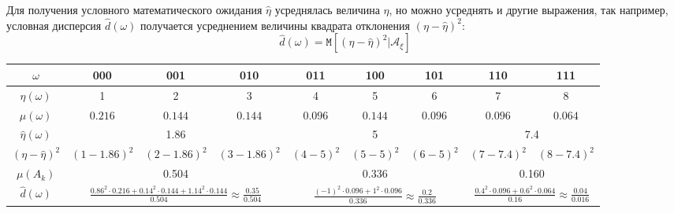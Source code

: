 \documentclass[a4paper,12pt]{article}
\newcommand{\cexpectation}[2]{\texttt{M} \left[ #1 | #2 \right]}
\begin{document}
Для получения условного математического ожидания $\widehat{\eta}$ усреднялась величина $\eta$, но можно усреднять и другие
выражения, так например, условная дисперсия $\widehat{d}(\omega)$ получается усреднением величины квадрата отклонения $(\eta - \widehat{\eta})^2$:
\[
    \widehat{d}(\omega) = \cexpectation{(\eta - \widehat{\eta})^2}{\mathcal{A}_\xi}
\]

\begin{center}
    \begin{tabular}{|c|c|c|c|c|c|c|c|c|}
        \hline
        $\omega$                                & 000                         & 001                         & 010                         & 011     & 100     & 101     & 110     & 111     \\
        \hline
        $\eta(\omega)$                          & 1                           & 2                           & 3                           & 4       & 5       & 6       & 7       & 8       \\
        \hline
        $\mu(\omega)$                           & $0.216$                     & $0.144$                     & $0.144$                     & $0.096$ & $0.144$ & $0.096$ & $0.096$ & $0.064$ \\
        \hline
        $\widehat{\eta}(\omega)$                & \multicolumn{3}{|c|}{1.86}  & \multicolumn{3}{|c|}{5}     & \multicolumn{2}{|c|}{7.4}                                                     \\
        \hline
        $(\eta - \widehat{\eta})^2$             & $(1-1.86)^2$                    & $(2-1.86)^2$                    & $(3-1.86)^2$                    & $(4-5)^2$     & $(5-5)^2$     & $(6-5)^2$     & $(7-7.4)^2$   & $(8-7.4)^2$     \\
        \hline
        $\mu(A_k)$                              & \multicolumn{3}{|c|}{0.504} & \multicolumn{3}{|c|}{0.336} & \multicolumn{2}{|c|}{0.160}                                                   \\
        \hline
        $\widehat{d}(\omega)$                   & \multicolumn{3}{|c|}{$\frac{0.86^2 \cdot 0.216 + 0.14^2 \cdot 0.144 + 1.14^2 \cdot 0.144}{0.504} \approx \frac{0.35}{0.504}$}  & \multicolumn{3}{|c|}{$\frac{(-1)^2 \cdot 0.096 + 1^2 \cdot 0.096}{0.336} \approx \frac{0.2}{0.336}$}     & \multicolumn{2}{|c|}{$\frac{0.4^2 \cdot 0.096 + 0.6^2 \cdot 0.064}{0.16} \approx \frac{0.04}{0.016}$}                                                     \\
        \hline
    \end{tabular}
\end{center}
\end{document}
